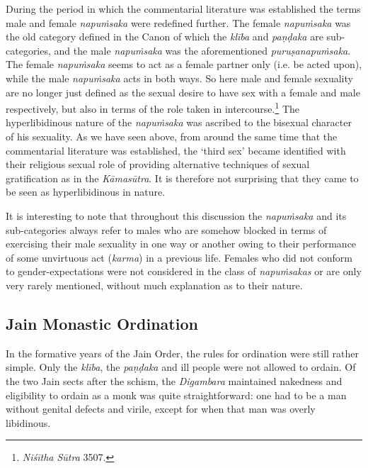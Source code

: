 During the period in which the commentarial literature was established the terms male and female \textit{napuṁsaka} were redefined further. The female \textit{napuṁsaka} was the old category defined in the Canon of which the \textit{klība} and \textit{paṇḍaka} are sub-categories, and the male \textit{napuṁsaka} was the aforementioned \textit{puruṣanapuṁsaka}. The female \textit{napuṁsaka} seems to act as a female partner only (i.e. be acted upon), while the male \textit{napuṁsaka} acts in both ways. So here male and female sexuality are no longer just defined as the sexual desire to have sex with a female and male respectively, but also in terms of the role taken in intercourse.\footnote{\textit{Niśītha Sūtra} 3507.} The hyperlibidinous nature of the \textit{napuṁsaka} was ascribed to the bisexual character of his sexuality. As we have seen above, from around the same time that the commentarial literature was established, the `third sex' became identified with their religious sexual role of providing alternative techniques of sexual gratification as in the \textit{Kāmasūtra}. It is therefore not surprising that they came to be seen as hyperlibidinous in nature.

It is interesting to note that throughout this discussion the \textit{napuṁsaka} and its sub-categories always refer to males who are somehow blocked in terms of exercising their male sexuality in one way or another owing to their performance of some unvirtuous act (\textit{karma}) in a previous life. Females who did not conform to gender-expectations were not considered in the class of \textit{napuṁsakas} or are only very rarely mentioned, without much explanation as to their nature. 

\subsection{Jain Monastic Ordination}
In the formative years of the Jain Order, the rules for ordination were still rather simple. Only the \textit{klība}, the \textit{paṇḍaka} and ill people were not allowed to ordain. Of the two Jain sects after the schism, the \textit{Digambara} maintained nakedness and eligibility to ordain as a monk was quite straightforward: one had to be a man without genital defects and virile, except for when that man was overly libidinous. 

